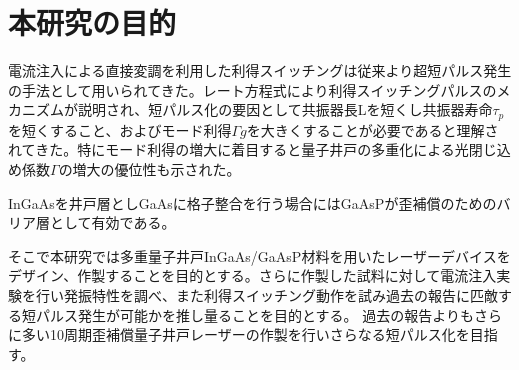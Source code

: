 \section{本研究の目的}
電流注入による直接変調を利用した利得スイッチングは従来より超短パルス発生の手法として用いられてきた。レート方程式により利得スイッチングパルスのメカニズムが説明され、短パルス化の要因として共振器長Lを短くし共振器寿命$\tau_{p}$を短くすること、およびモード利得$\Gamma g$を大きくすることが必要であると理解されてきた。特にモード利得の増大に着目すると量子井戸の多重化による光閉じ込め係数$\Gamma$の増大の優位性も示された。

InGaAsを井戸層としGaAsに格子整合を行う場合にはGaAsPが歪補償のためのバリア層として有効である。

そこで本研究では多重量子井戸InGaAs/GaAsP材料を用いたレーザーデバイスをデザイン、作製することを目的とする。さらに作製した試料に対して電流注入実験を行い発振特性を調べ、また利得スイッチング動作を試み過去の報告に匹敵する短パルス発生が可能かを推し量ることを目的とする。
過去の報告よりもさらに多い10周期歪補償量子井戸レーザーの作製を行いさらなる短パルス化を目指す。
